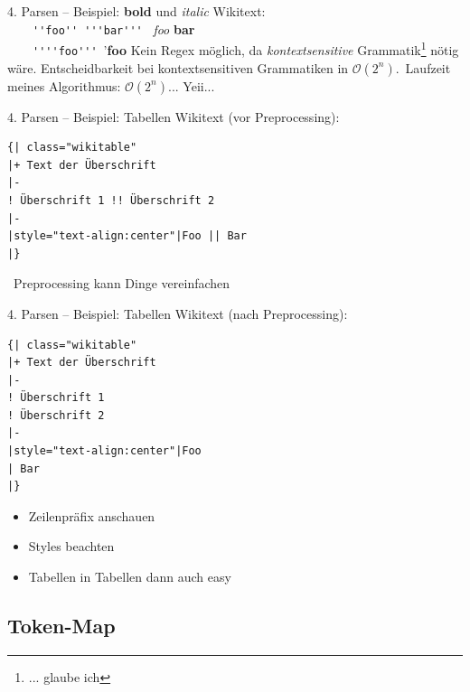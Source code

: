 \documentclass[9pt]{beamer}
\begin{document}
	\begin{frame}[fragile]{4. Parsen -- Beispiel: \textbf{bold} und \textit{italic}}
		Wikitext:\\
		~~~~\verb+''foo'' '''bar'''+ \textrightarrow\ \textit{foo} \textbf{bar}\\\pause
		~~~~\verb+''''foo+\pause\verb+'''+\pause \textrightarrow\ '\textbf{foo}\n\pause
		Kein Regex möglich, da \textit{kontextsensitive} Grammatik\footnote{... glaube ich} nötig wäre.\n
		Entscheidbarkeit bei kontextsensitiven Grammatiken in $\mathcal{O}(2^n)$.\pause\ Laufzeit meines Algorithmus: $\mathcal{O}(2^n)$.\pause.. Yeii...
	\end{frame}

	\begin{frame}[t,fragile]{4. Parsen -- Beispiel: Tabellen}
		Wikitext (vor Preprocessing):\\
		\begin{verbatim}
{| class="wikitable"
|+ Text der Überschrift
|-
! Überschrift 1 !! Überschrift 2
|-
|style="text-align:center"|Foo || Bar
|}

		\end{verbatim}
		\textrightarrow\ Preprocessing kann Dinge vereinfachen
	\end{frame}

	\begin{frame}[t,fragile]{4. Parsen -- Beispiel: Tabellen}
		Wikitext (nach Preprocessing):\\
		\begin{verbatim}
{| class="wikitable"
|+ Text der Überschrift
|-
! Überschrift 1
! Überschrift 2
|-
|style="text-align:center"|Foo
| Bar
|}
		\end{verbatim}
		\pause
		\begin{itemize}
			\item Zeilenpräfix anschauen
			\item Styles beachten
			\item Tabellen in Tabellen dann auch easy
		\end{itemize}
	\end{frame}

	\subsection{Token-Map}
\end{document}
